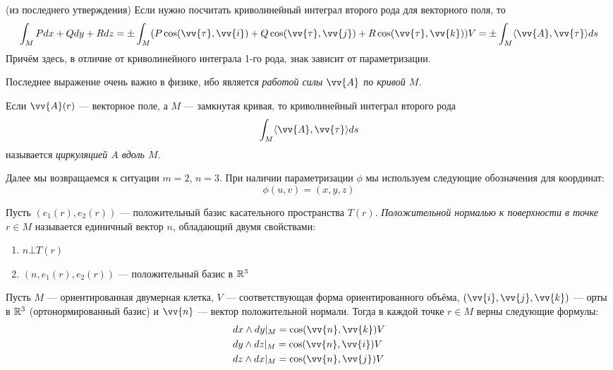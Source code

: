 \begin{corollary} (из последнего утверждения)
	Если нужно посчитать криволинейный интеграл второго рода для векторного поля, то
	\[
		\int_M Pdx + Qdy + Rdz = \pm \int_M (P\cos(\vv{\tau}, \vv{i}) + Q\cos(\vv{\tau}, \vv{j}) + R\cos(\vv{\tau}, \vv{k}))V = \pm \int_M \ntbr{\vv{A}, \vv{\tau}}ds
	\]
	Причём здесь, в отличие от криволинейного интеграла 1-го рода, знак зависит от параметризации.
\end{corollary}

\begin{note}
	Последнее выражение очень важно в физике, ибо является \textit{работой силы $\vv{A}$ по кривой $M$}.
\end{note}

\begin{definition}
	Если $\vv{A}(r)$ --- векторное поле, а $M$ --- замкнутая кривая, то криволинейный интеграл второго рода
	\[
		\int_M \ntbr{\vv{A}, \vv{\tau}}ds
	\]
	называется \textit{циркуляцией $A$ вдоль $M$}.
\end{definition}

\begin{note}
	Далее мы возвращаемся к ситуации $m = 2$, $n = 3$. При наличии параметризации $\phi$ мы используем следующие обозначения для координат:
	\[
		\phi(u, v) = (x, y, z)
	\]
\end{note}

\begin{definition}
	Пусть $(e_1(r), e_2(r))$ --- положительный базис касательного пространства $T(r)$. \textit{Положительной нормалью к поверхности в точке} $r \in M$ называется единичный вектор $n$, обладающий двумя свойствами:
	\begin{enumerate}
		\item $n \bot T(r)$
		
		\item $(n, e_1(r), e_2(r))$ --- положительный базис в $\mathbb{R}^3$
	\end{enumerate}
\end{definition}

\begin{proposition}
	Пусть $M$ --- ориентированная двумерная клетка, $V$ --- соответствующая форма ориентированного объёма, $(\vv{i}, \vv{j}, \vv{k})$ --- орты в $\mathbb{R}^3$ (ортонормированный базис) и $\vv{n}$ --- вектор положительной нормали. Тогда в каждой точке $r \in M$ верны следующие формулы:
	\begin{align*}
		&{dx \wedge dy|_M = \cos(\vv{n}, \vv{k})V}
		\\
		&{dy \wedge dz|_M = \cos(\vv{n}, \vv{i})V}
		\\
		&{dz \wedge dx|_M = \cos(\vv{n}, \vv{j})V}
	\end{align*}
\end{proposition}

